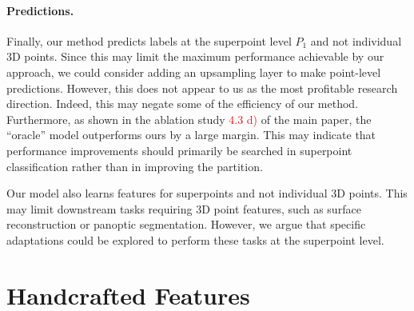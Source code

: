 \paragraph{Predictions.}
Finally, our method predicts labels at the superpoint level $P_{1}$ and not individual 3D points. 
Since this may limit the maximum performance achievable by our approach, we could consider adding an upsampling layer to make point-level predictions. However, this does not appear to us as the most profitable research direction. Indeed, this may negate some of the efficiency of our method. Furthermore, as shown in the ablation study \textcolor{red}{4.3 d)} of the main paper, the ``oracle'' model outperforms ours by a large margin. This may indicate that performance improvements should primarily be searched in superpoint classification rather than in improving the partition.

Our model also learns features for superpoints and not individual 3D points. This may limit downstream tasks requiring 3D point features, such as surface reconstruction or panoptic segmentation.
However, we argue that specific adaptations could be explored to perform these tasks at the superpoint level.

\section{Handcrafted Features}
\label{sec:hf}

